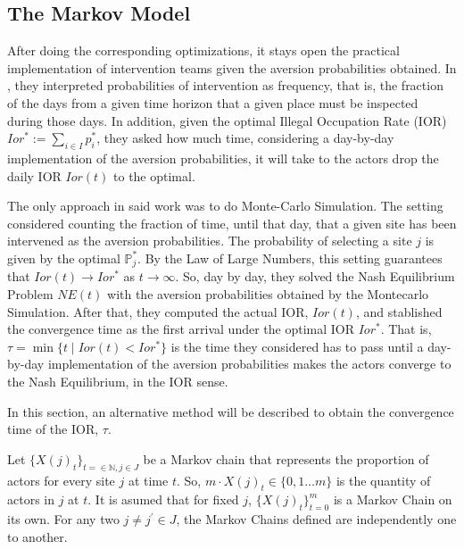 \documentclass{article}
\newcommand{\p}{\mathds{P}}
\begin{document}
\subsection{The Markov Model}
After doing the corresponding optimizations, it stays open the practical implementation of intervention teams given the aversion probabilities obtained. In \citep{Carrasco}, they interpreted probabilities of intervention as frequency, that is, the fraction of the days from a given time horizon that a given place must be inspected during those days. In addition, given the optimal Illegal Occupation Rate (IOR) $Ior^* := \sum\limits_{i \in I} p^*_i$, they asked how much time, considering a day-by-day implementation of the aversion probabilities, it will take to the actors drop the daily IOR $Ior(t)$ to the optimal.\par
The only approach in said work was to do Monte-Carlo Simulation. The setting considered counting the fraction of time, until that day, that a given site has been intervened as the aversion probabilities. The probability of selecting a site $j$ is given by the optimal $\p^*_j$. By the Law of Large Numbers, this setting guarantees that $Ior(t) \rightarrow Ior^*$ as $t\rightarrow \infty$. So, day by day, they solved the Nash Equilibrium Problem $NE(t)$ with the aversion probabilities obtained by the Montecarlo Simulation. After that, they computed the actual IOR, $Ior(t)$, and stablished the convergence time as the first arrival under the optimal IOR $Ior^*$. That is, $\tau = \min \{t \;\vert\; Ior(t) < Ior^*\}$ is the time they considered has to pass until a day-by-day implementation of the aversion probabilities makes the actors converge to the Nash Equilibrium, in the IOR sense.\par
In this section, an alternative method will be described to obtain the convergence time of the IOR, $\tau$.\par
Let $\{X(j)_t\}_{t=\in \mathbb{N}, j \in J}$ be a Markov chain that represents the proportion of actors for every site $j$ at time $t$. So, $m\cdot X(j)_t \in \{0,1 \dots m\}$ is the quantity of actors in $j$ at $t$. It is asumed that for fixed $j$, $\{X(j)_{t}\}_{t=0}^m$ is a Markov Chain on its own. For any two $j \not= j^{'} \in J$, the Markov Chains defined are independently one to another.\par
\end{document}
